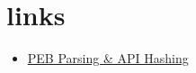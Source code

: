 \section{links}

\begin{itemize}
    \item \href{https://sealkisnotklaes.fr/articles/technique-API-hashing}{PEB Parsing \& API Hashing}
\end{itemize}
